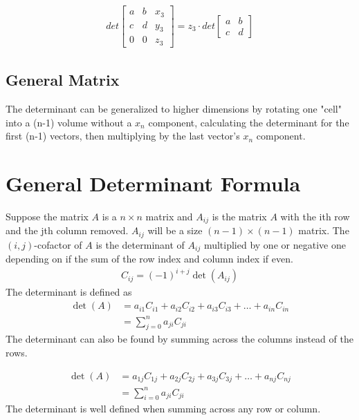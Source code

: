 \documentclass{article}
\theoremstyle{mytheoremstyle}
\theoremstyle{mytheoremstyle}
\theoremstyle{myproblemstyle}
\begin{document}
    \begin{align*}
        det \begin{bmatrix}
            a & b & x_3 \\
            c & d & y_3 \\
            0 & 0 & z_3
        \end{bmatrix} = z_3 \cdot det \begin{bmatrix}
            a & b \\
            c & d
        \end{bmatrix}
    \end{align*}

    \subsection*{General Matrix}
    The determinant can be generalized to higher dimensions by rotating one
    "cell" into a (n-1) volume without a $x_n$ component, calculating the
    determinant for the first (n-1) vectors, then multiplying by the last
    vector's $x_n$ component.

    \section*{General Determinant Formula}
    Suppose the matrix $A$ is a $n\times n$ matrix and $A_{ij}$ is the matrix
    $A$ with the ith row and the jth column removed. $A_{ij}$ will be a size
    $(n-1)\times (n-1)$ matrix. The $(i,j)$-cofactor of $A$ is the determinant
    of $A_{ij}$ multiplied by one or negative one depending on if the sum of the
    row index and column index if even.
    \begin{align*}
        C_{ij} = (-1)^{i+j} \det(A_{ij})
    \end{align*}
    The determinant is defined as
    \begin{align*}
        \det(A) &= a_{i1}C_{i1} +
                  a_{i2}C_{i2} +
                  a_{i3}C_{i3} +
                  \dots +
                  a_{in}C_{in} \\
                &= \sum_{j=0}^n a_{ji}C_{ji}
    \end{align*}
    The determinant can also be found by summing across the columns instead of
    the rows.

    \begin{align*}
        \det(A) &= a_{1j}C_{1j} +
                   a_{2j}C_{2j} +
                   a_{3j}C_{3j} +
                   \dots +
                   a_{nj}C_{nj} \\
                &= \sum_{i=0}^n a_{ji}C_{ji}
    \end{align*}
    The determinant is well defined when summing across any row or column.
\end{document}
